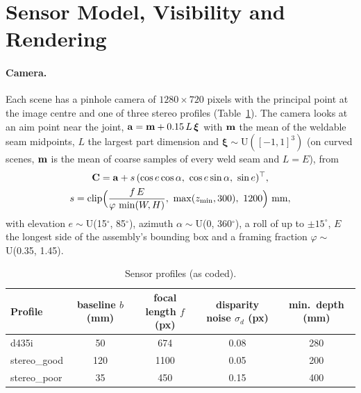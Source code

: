 \section{Sensor Model, Visibility and Rendering}
\label{sec:ws_sensor}

\paragraph{Camera.} Each scene has a pinhole camera of $1280\times720$ pixels with the
principal point at the image centre and one of three stereo profiles
(Table~\ref{tab:ws_profiles}). The camera looks at an aim point near the joint,
$\mathbf{a}=\mathbf{m}+0.15\,L\,\boldsymbol{\xi}$ with $\mathbf{m}$ the mean of the weldable seam
midpoints, $L$ the largest part dimension and $\boldsymbol{\xi}\sim\mathrm{U}([-1,1]^3)$ (on curved
scenes, $\mathbf{m}$ is the mean of coarse samples of every weld seam and $L=E$), from
\begin{equation}
\begin{gathered}
\vect{C}=\vect{a}+s\,(\cos e\cos\alpha,\ \cos e\sin\alpha,\ \sin e)^{\top},\\
s=\operatorname{clip}\!\Big(\frac{f\,E}{\varphi\,\min(W,H)},\ \max(z_{\min},300),\ 1200\Big)\ \mathrm{mm},
\end{gathered}
\label{eq:ws_pose}
\end{equation}
with elevation $e\sim$U(15$^\circ$, 85$^\circ$), azimuth $\alpha\sim$U(0, 360$^\circ$), a roll
of up to $\pm15^\circ$, $E$ the longest side of the assembly's bounding box and a framing
fraction $\varphi\sim$U(0.35, 1.45).
\begin{table}[htbp]
\caption{Sensor profiles (as coded).}
\label{tab:ws_profiles}
\centering\small
\begin{tabular}{@{}lcccc@{}}
\toprule
Profile & baseline $b$ (mm) & focal length $f$ (px) & disparity noise $\sigma_d$ (px) & min.\ depth (mm) \\
\midrule
d435i & 50 & 674 & 0.08 & 280 \\
stereo\_good & 120 & 1100 & 0.05 & 200 \\
stereo\_poor & 35 & 450 & 0.15 & 400 \\
\bottomrule
\end{tabular}
\end{table}

